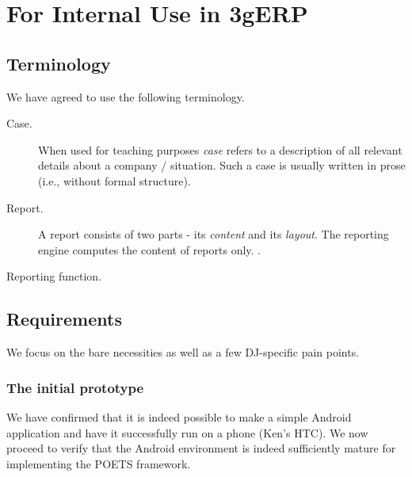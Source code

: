 \documentclass[envcountsame]{llncs}
\begin{document}
\section{For Internal Use in 3gERP}
\label{sec:internal-use-3gerp}

\subsection{Terminology}
\label{sec:terminology}
We have agreed to use the following terminology.

\begin{description}
\item[Case.] When used for teaching purposes \emph{case} refers to a
  description of all relevant details about a company /
  situation. Such a case is usually written in prose (i.e., without
  formal structure).

\item[Report.] A report consists of two parts - its \emph{content} and
  its \emph{layout}. The reporting engine computes the content of
  reports only.  .
\item[Reporting function.] 
\end{description}

\subsection{Requirements}
\label{sec:requirements}
We focus on the bare necessities as well as a few DJ-specific pain
points.

\subsubsection{The initial prototype}

We have confirmed that it is indeed possible to make a simple Android
application and have it successfully run on a phone (Ken's HTC). We
now proceed to verify that the Android environment is indeed
sufficiently mature for implementing the POETS framework.
\end{document}
